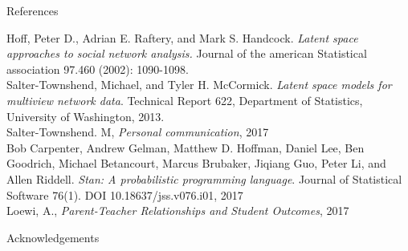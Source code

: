 \documentclass[final]{beamer}
\newlength{\onecolwid}
\begin{document}
\begin{frame}[t]
\begin{columns}[t]
\begin{column}{\onecolwid}
 \begin{block}{References}

 \small{
 \vspace{0.75in}}

Hoff, Peter D., Adrian E. Raftery, and Mark S. Handcock. \textit{Latent space approaches to social network analysis.} Journal of the american Statistical association 97.460 (2002): 1090-1098.\\
Salter-Townshend, Michael, and Tyler H. McCormick. \textit{Latent space models for multiview network data}. Technical Report 622, Department of Statistics, University of Washington, 2013.\\
Salter-Townshend. M, \textit{Personal communication}, 2017\\
Bob Carpenter, Andrew Gelman, Matthew D. Hoffman, Daniel Lee, Ben Goodrich, Michael Betancourt, Marcus Brubaker, Jiqiang Guo, Peter Li, and Allen Riddell. \textit{Stan: A probabilistic programming language}. Journal of Statistical Software 76(1). DOI 10.18637/jss.v076.i01, 2017\\
Loewi, A., \textit{Parent-Teacher Relationships and Student Outcomes}, 2017


 \end{block}



\begin{block}{Acknowledgements}

  {\small{}}

\end{block}



\end{column}
\end{columns}
\end{frame}
\end{document}
